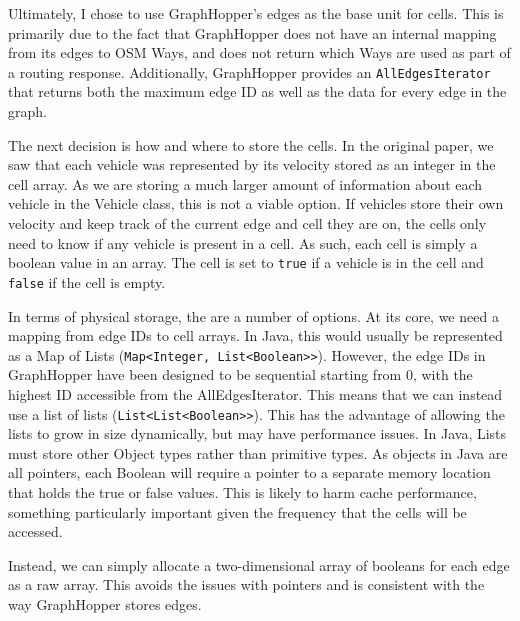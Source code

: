 \documentclass[ %
                    author={Alexander Hill},
                supervisor={Dr. Benjamin Sach},
                    degree={MEng},
                     title={MARMOSET},
                  subtitle={Multi-Agent Route Management using Online Simulation for Efficient Transportation},
                      type={research},
                      year={2016} ]{dissertation}
\begin{document}
Ultimately, I chose to use GraphHopper's edges as the base unit for cells. This
is primarily due to the fact that GraphHopper does not have an internal mapping
from its edges to OSM Ways, and does not return which Ways are used as part of a
routing response. Additionally, GraphHopper provides an
\texttt{AllEdgesIterator} that returns both the maximum edge ID as well as the
data for every edge in the graph.

The next decision is how and where to store the cells. In the original paper, we
saw that each vehicle was represented by its velocity stored as an integer in
the cell array. As we are storing a much larger amount of information about each
vehicle in the Vehicle class, this is not a viable option. If vehicles store
their own velocity and keep track of the current edge and cell they are on, the
cells only need to know if any vehicle is present in a cell. As such, each cell
is simply a boolean value in an array. The cell is set to \texttt{true} if a
vehicle is in the cell and \texttt{false} if the cell is empty.

In terms of physical storage, the are a number of options. At its core, we need
a mapping from edge IDs to cell arrays. In Java, this would usually be
represented as a Map of Lists (\texttt{Map<Integer, List<Boolean>>}). However,
the edge IDs in GraphHopper have been designed to be sequential starting from 0,
with the highest ID accessible from the AllEdgesIterator. This means that we can
instead use a list of lists (\texttt{List<List<Boolean>>}). This has the
advantage of allowing the lists to grow in size dynamically, but may have
performance issues. In Java, Lists must store other Object types rather than
primitive types. As objects in Java are all pointers, each Boolean will require
a pointer to a separate memory location that holds the true or false values.
This is likely to harm cache performance, something particularly important given
the frequency that the cells will be accessed.

Instead, we can simply allocate a two-dimensional array of booleans for each
edge as a raw array. This avoids the issues with pointers and is consistent with
the way GraphHopper stores edges.
\end{document}
